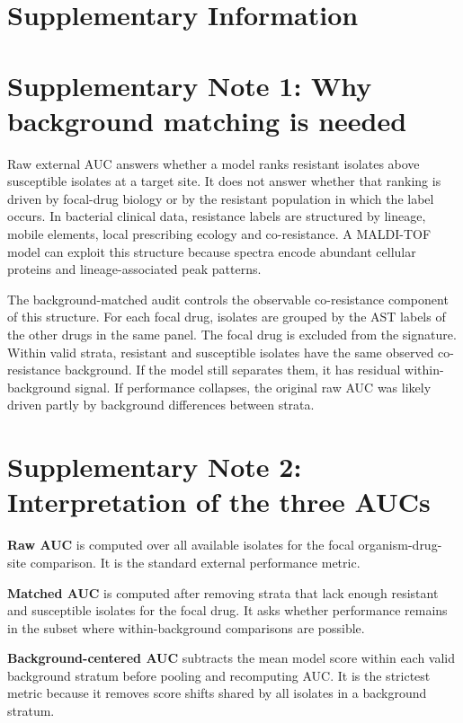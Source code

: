 \documentclass[11pt]{article}
\begin{document}
\clearpage
\appendix
\setcounter{figure}{0}
\setcounter{table}{0}
\renewcommand{\thefigure}{S\arabic{figure}}
\renewcommand{\thetable}{S\arabic{table}}

\section*{Supplementary Information}

\section*{Supplementary Note 1: Why background matching is needed}

Raw external AUC answers whether a model ranks resistant isolates above susceptible isolates at a target site. It does not answer whether that ranking is driven by focal-drug biology or by the resistant population in which the label occurs. In bacterial clinical data, resistance labels are structured by lineage, mobile elements, local prescribing ecology and co-resistance. A MALDI-TOF model can exploit this structure because spectra encode abundant cellular proteins and lineage-associated peak patterns.

The background-matched audit controls the observable co-resistance component of this structure. For each focal drug, isolates are grouped by the AST labels of the other drugs in the same panel. The focal drug is excluded from the signature. Within valid strata, resistant and susceptible isolates have the same observed co-resistance background. If the model still separates them, it has residual within-background signal. If performance collapses, the original raw AUC was likely driven partly by background differences between strata.

\section*{Supplementary Note 2: Interpretation of the three AUCs}

\textbf{Raw AUC} is computed over all available isolates for the focal organism-drug-site comparison. It is the standard external performance metric.

\textbf{Matched AUC} is computed after removing strata that lack enough resistant and susceptible isolates for the focal drug. It asks whether performance remains in the subset where within-background comparisons are possible.

\textbf{Background-centered AUC} subtracts the mean model score within each valid background stratum before pooling and recomputing AUC. It is the strictest metric because it removes score shifts shared by all isolates in a background stratum.
\end{document}

